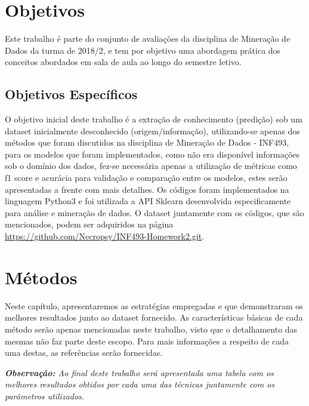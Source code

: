 \documentclass[
	12pt,				    %
	openright,			    %
	oneside,			    %
	a4paper,			    %
    sumario=tradicional,    %
	english,			    %
	brazil,				    %
	]{abntex2}
\begin{document}
\chapter{Objetivos}\label{sec:objetivos}
Este trabalho é parte do conjunto de avaliações da disciplina de Mineração de Dados da turma de 2018/2, e tem por objetivo uma abordagem prática dos conceitos abordados em sala de aula ao longo do semestre letivo.

\section{Objetivos Específicos}\label{sec:ObjetivosEspec}
O objetivo inicial deste trabalho é a extração de conhecimento (predição) sob um dataset inicialmente desconhecido (origem/informação), utilizando-se apenas dos métodos que foram discutidos na disciplina de Mineração de Dados - INF493, para os modelos que foram implementados, como não era disponível informações sob o domínio dos dados, fez-se necessária apenas a utilização de métricas como f1 score e acurácia para validação e comparação entre os modelos, estes serão apresentadas a frente com mais detalhes.
Os códigos foram implementados na linguagem Python3 e foi utilizada a API Sklearn desenvolvida especificamente para análise e mineração de dados. O dataset juntamente com os códigos, que são mencionados, podem ser adquiridos na página \url{https://github.com/Necropsy/INF493-Homework2.git}.

\chapter{Métodos}\label{sec:metodos}
Neste capítulo, apresentaremos as estratégias empregadas e que demonstraram os melhores resultados junto ao dataset fornecido. As características básicas de cada método serão apenas mencionadas neste trabalho, visto que o detalhamento das mesmas não faz parte deste escopo. Para mais informações a respeito de cada uma destas, as referências serão fornecidas.

\textit{\textbf{Observação:} Ao final deste trabalho será apresentada uma tabela com os melhores resultados obtidos por cada uma das técnicas juntamente com os parâmetros utilizados.}
\end{document}
